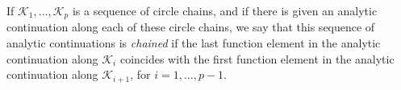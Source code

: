 If $\mathcal{K}_1, \ldots, \mathcal{K}_p$ is a sequence of circle chains, and if there is given an analytic continuation along each of these circle chains, we say that this sequence of analytic continuations is \textit{chained} if the last function element in the analytic continuation along $\mathcal{K}_i$ coincides with the first function element in the analytic continuation along $\mathcal{K}_{i+1}$, for $i = 1, \ldots, p - 1$.
